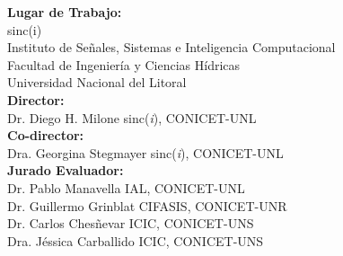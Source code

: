 {\large \noindent \textbf{Lugar de Trabajo:}\\
\vspace{1em}sinc(i)\\
Instituto de Señales, Sistemas e Inteligencia Computacional\\
Facultad de Ingeniería y Ciencias Hídricas\\
Universidad Nacional del Litoral\\[0.5cm]

\noindent\textbf{Director:}\\
Dr. Diego H. Milone\hspace{13.2em} sinc(\textit{i}), CONICET-UNL\\[0.3cm]
\noindent\textbf{Co-director:}\\
Dra. Georgina Stegmayer\hspace{11em} sinc(\textit{i}), CONICET-UNL\\[0.3cm]

\noindent\textbf{Jurado Evaluador:}\\[0.2cm]
Dr. Pablo Manavella\hspace{13.1em} IAL, CONICET-UNL\\[0.1cm]
Dr. Guillermo Grinblat\hspace{12em} CIFASIS, CONICET-UNR\\[0.1cm]
Dr. Carlos Chesñevar\hspace{12.8em} ICIC, CONICET-UNS\\[0.1cm]
Dra. Jéssica Carballido\hspace{12.1em} ICIC, CONICET-UNS\\[0.1cm]
}
